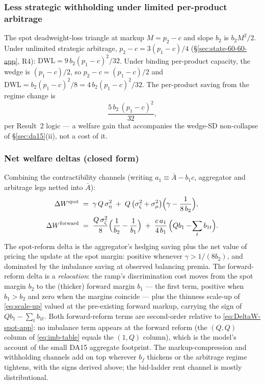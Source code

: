 \documentclass[11pt,a4paper]{article}
\theoremstyle{definition}
\theoremstyle{remark}
\theoremstyle{plain}
\begin{document}
\subsubsection{Less strategic withholding under limited per-product arbitrage}

The spot deadweight-loss triangle at markup $M = p_2 - c$ and slope $b_2$ is $b_2 M^2/2$. Under unlimited strategic arbitrage, $p_2 - c = 3(p_1 - c)/4$ (\S\ref{sec:state-60-60-app}, R4): $\text{DWL} = 9\, b_2 (p_1 - c)^2/32$. Under binding per-product capacity, the wedge is $(p_1 - c)/2$, so $p_2 - c = (p_1 - c)/2$ and $\text{DWL} = b_2 (p_1 - c)^2/8 = 4\, b_2 (p_1 - c)^2/32$. The per-product saving from the regime change is
\[
\frac{5\, b_2\, (p_1 - c)^2}{32},
\]
per \citeauthor{ito_reguant_2016} Result~2 logic --- a welfare gain that accompanies the wedge-SD non-collapse of \S\ref{sec:da15}(ii), not a cost of it.

\subsubsection{Net welfare deltas (closed form)}

Combining the contractibility channels (writing $a_1 \equiv \bar A - b_1 c$, aggregator and arbitrage legs netted into $\bar A$):
\begin{align}
\Delta W^{\text{spot}} \;&=\; \gamma\, Q\, \sigma_\eta^2 \;+\; Q\,\bigl(\sigma_\zeta^2 + \sigma_\mu^2\bigr)\Bigl(\gamma - \frac{1}{8\, b_2}\Bigr), \label{eq:DeltaW-spot-app}\\[2pt]
\Delta W^{\text{forward}} \;&=\; \frac{Q\, \sigma_\zeta^2}{8}\Bigl(\frac{1}{b_2} - \frac{1}{b_1}\Bigr) \;+\; \frac{c\, a_1}{4\, b_1}\,\Big(Q b_1 - \!\sum_t b_{1t}\Big). \label{eq:DeltaW-fwd-app}
\end{align}
The spot-reform delta is the aggregator's hedging saving plus the net value of pricing the update at the spot margin: positive whenever $\gamma > 1/(8 b_2)$, and dominated by the imbalance saving at observed balancing premia. The forward-reform delta is a \emph{relocation}: the ramp's discrimination cost moves from the spot margin $b_2$ to the (thicker) forward margin $b_1$ --- the first term, positive when $b_1 > b_2$ and zero when the margins coincide --- plus the thinness scale-up of \eqref{eq:scale-up} valued at the pre-existing forward markup, carrying the sign of $Q b_1 - \sum_t b_{1t}$. Both forward-reform terms are second-order relative to \eqref{eq:DeltaW-spot-app}: no imbalance term appears at the forward reform (the $(Q,Q)$ column of \eqref{eq:imb-table} equals the $(1,Q)$ column), which is the model's account of the small DA15 aggregate footprint. The markup-compression and withholding channels add on top wherever $b_f$ thickens or the arbitrage regime tightens, with the signs derived above; the bid-ladder rent channel is mostly distributional.
\end{document}
